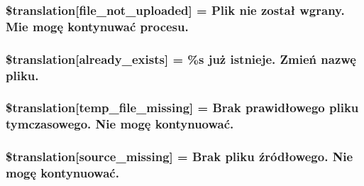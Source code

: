 \subsubsection[{\$translation}]{\setlength{\rightskip}{0pt plus 5cm}\$translation\mbox{[}\textquotesingle{}file\+\_\+not\+\_\+uploaded\textquotesingle{}\mbox{]} = \textquotesingle{}Plik nie został wgrany. Mie mogę kontynuwać procesu.\textquotesingle{}}\label{class_8upload_8pl___p_l_8php_a4ce76e7be0b3a03c2b47f6d70c21832e}
\hypertarget{class_8upload_8pl___p_l_8php_afd84e910217f04139f567c41e292afa5}{}
\subsubsection[{\$translation}]{\setlength{\rightskip}{0pt plus 5cm}\$translation\mbox{[}\textquotesingle{}already\+\_\+exists\textquotesingle{}\mbox{]} = \textquotesingle{}\%s już istnieje. Zmień nazwę pliku.\textquotesingle{}}\label{class_8upload_8pl___p_l_8php_afd84e910217f04139f567c41e292afa5}
\hypertarget{class_8upload_8pl___p_l_8php_ab0fa87a88aba2624004581eed0633325}{}
\subsubsection[{\$translation}]{\setlength{\rightskip}{0pt plus 5cm}\$translation\mbox{[}\textquotesingle{}temp\+\_\+file\+\_\+missing\textquotesingle{}\mbox{]} = \textquotesingle{}Brak prawidłowego pliku tymczasowego. Nie mogę kontynuować.\textquotesingle{}}\label{class_8upload_8pl___p_l_8php_ab0fa87a88aba2624004581eed0633325}
\hypertarget{class_8upload_8pl___p_l_8php_aceaaf7355acaaf10f0ae60378d03c468}{}
\subsubsection[{\$translation}]{\setlength{\rightskip}{0pt plus 5cm}\$translation\mbox{[}\textquotesingle{}source\+\_\+missing\textquotesingle{}\mbox{]} = \textquotesingle{}Brak pliku źródłowego. Nie mogę kontynuować.\textquotesingle{}}\label{class_8upload_8pl___p_l_8php_aceaaf7355acaaf10f0ae60378d03c468}
\hypertarget{class_8upload_8pl___p_l_8php_aff2427c72a2598aefa6d58df1dd18b08}{}
